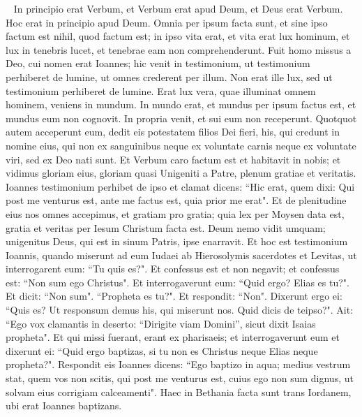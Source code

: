 
\begin{biblechapter}  
\verse In principio erat Verbum, et Verbum erat apud Deum, et Deus erat Verbum. 
\verse Hoc erat in principio apud Deum. 
\verse Omnia per ipsum facta sunt, et sine ipso factum est nihil, quod factum est; 
\verse in ipso vita erat, et vita erat lux hominum, 
\verse et lux in tenebris lucet, et tenebrae eam non comprehenderunt. 
\verse Fuit homo missus a Deo, cui nomen erat Ioannes; 
\verse hic venit in testimonium, ut testimonium perhiberet de lumine, ut omnes crederent per illum.  
\verse Non erat ille lux, sed ut testimonium perhiberet de lumine. 
\verse Erat lux vera, quae illuminat omnem hominem, veniens in mundum. 
\verse In mundo erat, et mundus per ipsum factus est, et mundus eum non cognovit. 
\verse In propria venit, et sui eum non receperunt. 
\verse Quotquot autem acceperunt eum, dedit eis potestatem filios Dei fieri, his, qui credunt in nomine eius, 
\verse qui non ex sanguinibus neque ex voluntate carnis neque ex voluntate viri, sed ex Deo nati sunt. 
\verse Et Verbum caro factum est et habitavit in nobis; et vidimus gloriam eius, gloriam quasi Unigeniti a Patre, plenum gratiae et veritatis. 
\verse Ioannes testimonium perhibet de ipso et clamat dicens: “Hic erat, quem dixi: Qui post me venturus est, ante me factus est, quia prior me erat". 
\verse Et de plenitudine eius nos omnes accepimus, et gratiam pro gratia; 
\verse quia lex per Moysen data est, gratia et veritas per Iesum Christum facta est.  
\verse Deum nemo vidit umquam; unigenitus Deus, qui est in sinum Patris, ipse enarravit. 
\verse Et hoc est testimonium Ioannis, quando miserunt ad eum Iudaei ab Hierosolymis sacerdotes et Levitas, ut interrogarent eum: “Tu quis es?". 
\verse Et confessus est et non negavit; et confessus est: “Non sum ego Christus". 
\verse Et interrogaverunt eum: “Quid ergo? Elias es tu?". Et dicit: “Non sum". “Propheta es tu?". Et respondit: “Non". 
\verse Dixerunt ergo ei: “Quis es? Ut responsum demus his, qui miserunt nos. Quid dicis de teipso?". 
\verse Ait: “Ego vox clamantis in deserto: “Dirigite viam Domini”, sicut dixit Isaias propheta". 
\verse Et qui missi fuerant, erant ex pharisaeis; 
\verse et interrogaverunt eum et dixerunt ei: “Quid ergo baptizas, si tu non es Christus neque Elias neque propheta?". 
\verse Respondit eis Ioannes dicens: “Ego baptizo in aqua; medius vestrum stat, quem vos non scitis, 
\verse qui post me venturus est, cuius ego non sum dignus, ut solvam eius corrigiam calceamenti". 
\verse Haec in Bethania facta sunt trans Iordanem, ubi erat Ioannes baptizans. 

\end{biblechapter}
